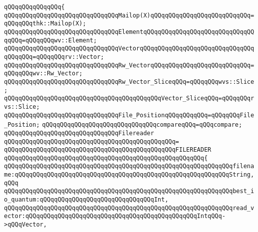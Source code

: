 \newline
\verb|qQQqqQQqqQQqqQQq{|\newline
\verb|qQQqqQQqqQQqqQQqqQQqqQQqqQQqqQQqMailop(X)qQQqqQQqqQQqqQQqqQQqqQQqqQQq=qQQqqQQqthk::Mailop(X);|\newline
\newline
\verb|qQQqqQQqqQQqqQQqqQQqqQQqqQQqqQQqElementqQQqqQQqqQQqqQQqqQQqqQQqqQQqqQQqqQQq=qQQqqQQqwv::Element;|\newline
\verb|qQQqqQQqqQQqqQQqqQQqqQQqqQQqqQQqVectorqQQqqQQqqQQqqQQqqQQqqQQqqQQqqQQqqQQqqQQq=qQQqqQQqrv::Vector;|\newline
\newline
\verb|qQQqqQQqqQQqqQQqqQQqqQQqqQQqqQQqRw_VectorqQQqqQQqqQQqqQQqqQQqqQQqqQQq=qQQqqQQqwv::Rw_Vector;|\newline
\newline
\verb|qQQqqQQqqQQqqQQqqQQqqQQqqQQqqQQqRw_Vector_SliceqQQq=qQQqqQQqwvs::Slice;|\newline
\verb|qQQqqQQqqQQqqQQqqQQqqQQqqQQqqQQqqQQqqQQqqQQqVector_SliceqQQq=qQQqqQQqrvs::Slice;|\newline
\newline
\verb|qQQqqQQqqQQqqQQqqQQqqQQqqQQqqQQqFile_PositionqQQqqQQqqQQq=qQQqqQQqFile_Position;|\newline
\newline
\verb|qQQqqQQqqQQqqQQqqQQqqQQqqQQqqQQqcompareqQQq=qQQqcompare;|\newline
\newline
\verb|qQQqqQQqqQQqqQQqqQQqqQQqqQQqqQQqFilereader|\newline
\verb|qQQqqQQqqQQqqQQqqQQqqQQqqQQqqQQqqQQqqQQqqQQqqQQq=|\newline
\verb|qQQqqQQqqQQqqQQqqQQqqQQqqQQqqQQqqQQqqQQqqQQqqQQqFILEREADER|\newline
\verb|qQQqqQQqqQQqqQQqqQQqqQQqqQQqqQQqqQQqqQQqqQQqqQQqqQQqqQQq{|\newline
\verb|qQQqqQQqqQQqqQQqqQQqqQQqqQQqqQQqqQQqqQQqqQQqqQQqqQQqqQQqqQQqqQQqfilename:qQQqqQQqqQQqqQQqqQQqqQQqqQQqqQQqqQQqqQQqqQQqqQQqqQQqqQQqqQQqString,qQQq|\newline
\verb|qQQqqQQqqQQqqQQqqQQqqQQqqQQqqQQqqQQqqQQqqQQqqQQqqQQqqQQqqQQqqQQqbest_io_quantum:qQQqqQQqqQQqqQQqqQQqqQQqqQQqqQQqInt,|\newline
\newline
\verb|qQQqqQQqqQQqqQQqqQQqqQQqqQQqqQQqqQQqqQQqqQQqqQQqqQQqqQQqqQQqqQQqread_vector:qQQqqQQqqQQqqQQqqQQqqQQqqQQqqQQqqQQqqQQqqQQqqQQqIntqQQq->qQQqVector,|\newline
\newline
